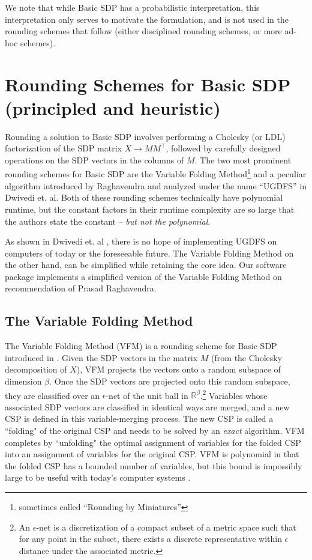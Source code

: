 \documentclass[12pt]{article} %
\begin{document}
We note that while Basic SDP has a probabilistic interpretation, this interpretation only serves to motivate the formulation, and is not used in the rounding schemes that follow (either disciplined rounding schemes, or more ad-hoc schemes).

\section{Rounding Schemes for Basic SDP (principled and heuristic)}

Rounding a solution to Basic SDP involves performing a Cholesky (or LDL) factorization of the SDP matrix $X \rightarrow MM^{\intercal} $, followed by carefully designed operations on the SDP vectors in the columns of $M$. The two most prominent rounding schemes for Basic SDP are the Variable Folding Method\footnote{sometimes called ``Rounding by Miniatures''} \cite{raghavendra2009round} and a peculiar algorithm introduced by Raghavendra \citep{raghavendra2008optimal} and analyzed under the name ``UGDFS'' in Dwivedi et. al\cite{dwivedi2015introduction}. Both of these rounding schemes technically have polynomial runtime, but the constant factors in their runtime complexity are so large that the authors state the constant -- \textit{but not the polynomial}.

As shown in Dwivedi et. al \cite{dwivedi2015introduction}, there is no hope of implementing UGDFS on computers of today or the foreseeable future. The Variable Folding Method on the other hand, can be simplified while retaining the core idea. Our software package implements a simplified version of the Variable Folding Method on recommendation of Prasad Raghavendra. 

\subsection{The Variable Folding Method}

The Variable Folding Method (VFM) is a rounding scheme for Basic SDP introduced in \cite{raghavendra2009round}. Given the SDP vectors in the matrix $M$ (from the Cholesky decomposition of $X$), VFM projects the vectors onto a random subspace of dimension $\beta$. Once the SDP vectors are projected onto this random subspace, they are classified over an $\epsilon$-net of the unit ball in $\mathbb{R}^\beta$.\footnote{An $\epsilon$-net is a discretization of a compact subset of a metric space such that for any point in the subset, there exists a discrete representative within $\epsilon$ distance under the associated metric.} Variables whose associated SDP vectors are classified in identical ways are merged, and a new CSP is defined in this variable-merging process. The new CSP is called a ``folding" of the original CSP and needs to be solved by an \textit{exact} algorithm. VFM completes by ``unfolding" the optimal assignment of variables for the folded CSP into an assignment of variables for the original CSP. VFM is polynomial in that the folded CSP has a bounded number of variables, but this bound is impossibly large to be useful with today's computer systems \citep{dwivedi2015introduction}. 
\end{document}
